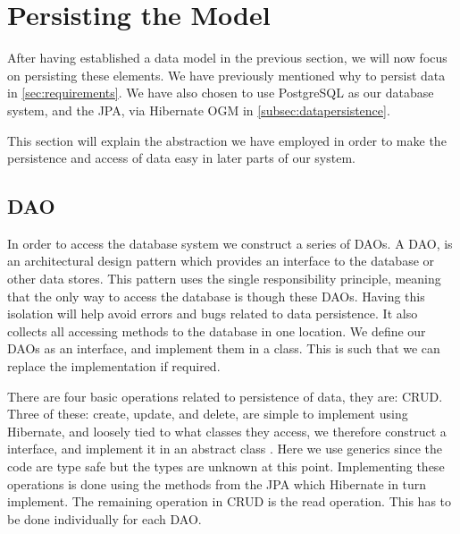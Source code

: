 \chapter{Persisting the Model}\label{subsec:persistingtodb}

After having established a data model in the previous section, we will now focus on persisting these elements.
We have previously mentioned why to persist data in \cref{sec:requirements}.
We have also chosen to use PostgreSQL as our database system, and the \ac{JPA}, via Hibernate OGM in \cref{subsec:datapersistence}.

This section will explain the abstraction we have employed in order to make the persistence and access of data easy in later parts of our system.

\section{\acl{DAO}}\label{subsubsec:dao}
In order to access the database system we construct a series of \acp{DAO}.
A \ac{DAO}, is an architectural design pattern which provides an interface to the database or other data stores\cite{oracle_dao}.
This pattern uses the single responsibility principle, meaning that the only way to access the database is though these \acp{DAO}.
Having this isolation will help avoid errors and bugs related to data persistence.
It also collects all accessing methods to the database in one location.
We define our \acp{DAO} as an interface, and implement them in a class.
This is such that we can replace the implementation if required. 

There are four basic operations related to persistence of data, they are: \ac{CRUD}.
Three of these: create, update, and delete, are simple to implement using Hibernate, and loosely tied to what classes they access, we therefore construct a  interface, and implement it in an abstract class .
Here we use generics since the code are type safe but the types are unknown at this point.
Implementing these operations is done using the methods from the \ac{JPA} which Hibernate in turn implement.
The remaining operation in \ac{CRUD} is the read operation.
This has to be done individually for each \ac{DAO}.

